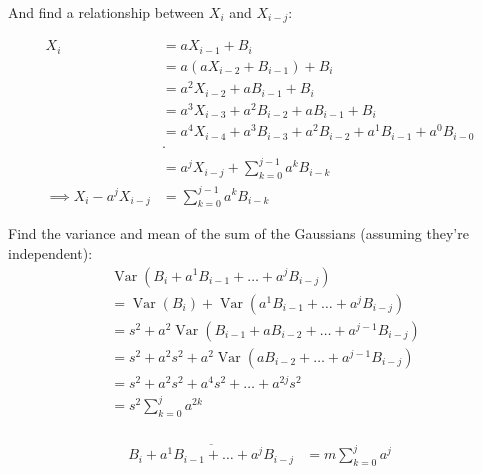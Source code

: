 And find a relationship between $X_i$ and $X_{i-j}$:
    
\begin{align*}
    X_i &= aX_{i-1} + B_i \\
    &= a(aX_{i-2} + B_{i-1}) + B_i \\
    &= a^2X_{i-2} + aB_{i-1} + B_i \\
    &= a^3X_{i-3} + a^2B_{i-2} + aB_{i-1} + B_i \\
    &= a^4X_{i-4} + a^3B_{i-3} + a^2B_{i-2} + a^1B_{i-1} + a^0B_{i-0} \\
    & \cdot \\
    &= a^jX_{i-j} + \sum_{k=0}^{j-1}a^kB_{i-k} \\
    \implies X_i - a^jX_{i-j} &= \sum_{k=0}^{j-1}a^kB_{i-k}
\end{align*}

Find the variance and mean of the sum of the Gaussians (assuming they're independent):
\begin{align*}
    &\operatorname{Var}(B_{i} + a^1B_{i-1} + \ldots + a^jB_{i-j}) \\
    &= \operatorname{Var}(B_{i}) + \operatorname{Var}(a^1B_{i-1} + \ldots + a^jB_{i-j})\\
    &= s^2 + a^2\operatorname{Var}(B_{i-1} + a B_{i-2} + \ldots + a^{j-1}B_{i-j})\\
    &= s^2 + a^2s^2 + a^2\operatorname{Var}(a B_{i-2} + \ldots + a^{j-1}B_{i-j})\\
    &= s^2 + a^2s^2 + a^4s^2 + \ldots + a^{2j}s^2\\
    &= s^2\sum_{k=0}^{j}a^{2k}\\
\end{align*}

\begin{align*}
    \overline{B_{i} + a^1B_{i-1} + \ldots + a^jB_{i-j}} &= m\sum_{k=0}^j a^j \\
\end{align*}


